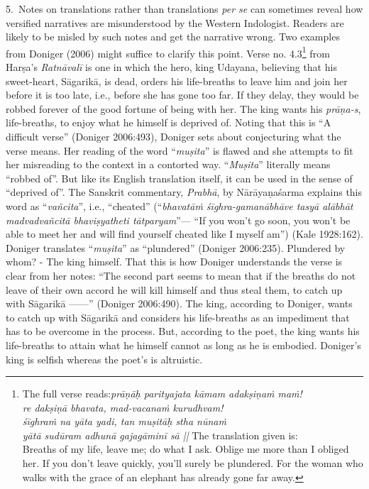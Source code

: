 5.~Notes on translations rather than translations \textsl{per se} can sometimes reveal how versified narratives are misunderstood by the Western Indologist. Readers are likely to be misled by such notes and get the narrative wrong. Two examples from Doniger (2006) might suffice to clarify this point. Verse no. 4.3\footnote[3]{The full verse reads:\textsl{prāṇāḥ parityajata kāmam adakṣiṇaṁ maṁ!}\\
\textsl{re dakṣiṇā bhavata, mad-vacanaṁ kurudhvam!}\\
\textsl{śīghraṁ na yāta yadi, tan muṣitāḥ stha nūnaṁ}\\
\textsl{yātā sudūram adhunā gajagāminī sā ||}
The translation given is:\\
Breaths of my life, leave me; do what I ask. Oblige me more than I obliged her. If you don’t leave quickly, you’ll surely be plundered. For the woman who walks with the grace of an elephant has already gone far away.} from Harṣa’s \textsl{Ratnāvalī} is one in which the hero, king Udayana, believing that his sweet-heart, Sāgarikā, is dead, orders his life-breaths to leave him and join her before it is too late, i.e., before she has gone too far. If they delay, they would be robbed forever of the good fortune of being with her. The king wants his \textsl{prāṇa-s}, life-breaths, to enjoy what he himself is deprived of. Noting that this is “A difficult verse” (Doniger 2006:493), Doniger sets about conjecturing what the verse means. Her reading of the word “\textsl{muṣita}” is flawed and she attempts to fit her misreading to the context in a contorted way. “\textsl{Muṣita}” literally means “robbed of”. But like its English translation itself, it can be used in the sense of “deprived of”. The Sanskrit commentary, \textsl{Prabhā}, by Nārāyaṇaśarma explains this word as “\textsl{vañcita}”, i.e., “cheated” (“\textsl{bhavatāṁ śīghra-gamanābhāve tasyā alābhāt madvadvañcitā bhaviṣyatheti tātparyam}”--- “If you won’t go soon, you won’t be able to meet her and will find yourself cheated like I myself am”) (Kale 1928:162). Doniger translates “\textsl{muṣita}” as “plundered” (Doniger 2006:235). Plundered by whom? - The king himself. That this is how Doniger understands the verse is clear from her notes: “The second part seems to mean that if the breaths do not leave of their own accord he will kill himself and thus steal them, to catch up with Sāgarikā —---” (Doniger 2006:490). The king, according to Doniger, wants to catch up with Sāgarikā and considers his life-breaths as an impediment that has to be overcome in the process. But, according to the poet, the king wants his life-breaths to attain what he himself cannot as long as he is embodied. Doniger’s king is selfish whereas the poet’s is altruistic.

